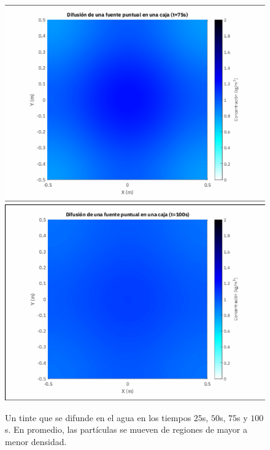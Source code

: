 \begin{figure}[ht!]
    \includegraphics[width=.3\paperwidth]{E_IMAGENES/1_Capitulo2/75.png}\qquad
    \includegraphics[width=.3\paperwidth]{E_IMAGENES/1_Capitulo2/100.png}
    \caption[corto]{Un tinte que se difunde en el agua en los tiempos
        $25$s, $50$s, $75$s y $100$s.
        En promedio, las partículas se mueven de regiones de mayor a menor densidad.}
\end{figure}

